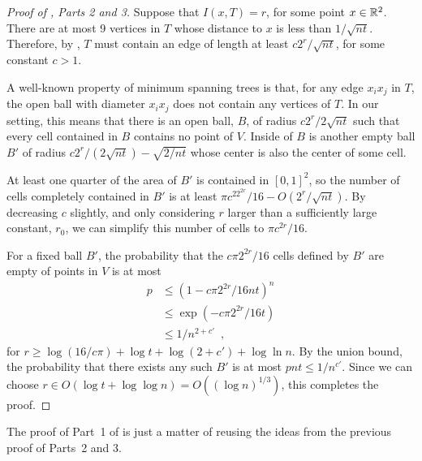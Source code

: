 \documentclass{patmorin}
\begin{document}
\begin{proof}[Proof of , Parts 2 and 3]
Suppose that $I(x,T)=r$, for some point $x\in\mathbb{R}^2$.  There are at most
9 vertices in $T$ whose distance to $x$ is less than $1/\sqrt{nt}$.
Therefore, by , $T$ must contain an edge of length at least
$c2^r/\sqrt{nt}$, for some constant $c>1$.  

A well-known property of minimum spanning trees is that, for any edge
$x_ix_j$ in $T$, the open ball with diameter $x_ix_j$ does not contain
any vertices of $T$.  In our setting, this means that there is an open
ball, $B$, of radius $c2^r/2\sqrt{nt}$ such that every cell contained in
$B$ contains no point of $V$.  Inside of $B$ is another empty ball $B'$
of radius $c2^r/(2\sqrt{nt})-\sqrt{2/nt}$ whose center is also the center
of some cell.

At least one quarter of the area of $B'$ is contained in $[0,1]^2$,
so the number of cells completely contained in $B'$ is at least $\pi c^22^{2r}/16 -
O(2^{r}/\sqrt{nt})$.  By decreasing $c$ slightly, and only considering
$r$ larger than a sufficiently large constant, $r_0$, we can simplify
this number of cells to $\pi c^{2r}/16$.

For a fixed ball $B'$, the probability that the $c\pi  2^{2r}/16$ cells
defined by $B'$ are empty of points in $V$ is at most
\begin{align*}
 p 
  & \le (1-c\pi 2^{2r}/{16nt})^{n} \\
  & \le \exp(-c\pi 2^{2r}/16t) \\
 & \le 1/n^{2+c'} \enspace ,
\end{align*}
for $r\ge\log(16/c\pi)+\log t + \log(2+c')+\log\ln n$.  By the union bound, the
probability that there exists any such $B'$ is at most
$pnt\le 1/n^{c'}$.  Since we can choose $r\in O(\log t+\log\log n) = O((\log
n)^{1/3})$, this completes the proof.
\end{proof}

The proof of Part~1 of  is just a matter of reusing the ideas
from the previous proof of Parts~2 and 3.
\end{document}

